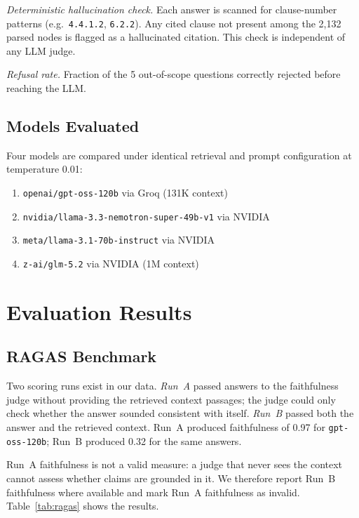 \documentclass[conference]{IEEEtran}
\begin{document}
\textit{Deterministic hallucination check.}
Each answer is scanned for clause-number patterns
(e.g.\ \texttt{4.4.1.2}, \texttt{6.2.2}).
Any cited clause not present among the 2{,}132 parsed nodes is
flagged as a hallucinated citation.
This check is independent of any LLM judge.

\textit{Refusal rate.}
Fraction of the 5 out-of-scope questions correctly rejected before
reaching the LLM.

\subsection{Models Evaluated}

Four models are compared under identical retrieval and prompt
configuration at temperature 0.01:
\begin{enumerate}
  \item \texttt{openai/gpt-oss-120b} via Groq (131K context)
  \item \texttt{nvidia/llama-3.3-nemotron-super-49b-v1} via NVIDIA
  \item \texttt{meta/llama-3.1-70b-instruct} via NVIDIA
  \item \texttt{z-ai/glm-5.2} via NVIDIA (1M context)
\end{enumerate}

\section{Evaluation Results}
\label{sec:eval}

\subsection{RAGAS Benchmark}

Two scoring runs exist in our data.
\textit{Run~A} passed answers to the faithfulness judge without
providing the retrieved context passages; the judge could only check
whether the answer sounded consistent with itself.
\textit{Run~B} passed both the answer and the retrieved context.
Run~A produced faithfulness of 0.97 for \texttt{gpt-oss-120b}; Run~B
produced 0.32 for the same answers.

Run~A faithfulness is not a valid measure: a judge that never sees the
context cannot assess whether claims are grounded in it.
We therefore report Run~B faithfulness where available and mark
Run~A faithfulness as invalid.
Table~\ref{tab:ragas} shows the results.
\end{document}

